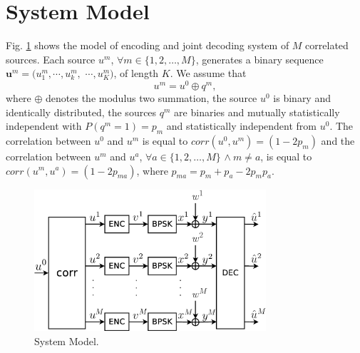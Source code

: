 \documentclass[journal]{IEEEtran}
\begin{document}
\section{System Model} \label{sec:SystemModel}

Fig. \ref{fig:modelo} shows the model of encoding and joint 
decoding system of $M$ correlated sources.
Each source $u^{m}$, $\forall m \in \{1, 2, \ldots, M\}$, generates a binary 
sequence $\mathbf{u}^{m}=(u_1^{m}, \cdots, u_k^{m},$ $\cdots, u_{K}^{m}) $, of length $K$.
 We assume that
 \begin{equation}\label{eq:fontes}
u^{m}=u^{0} \oplus q^{m},
\end{equation}
where $\oplus$ denotes the modulus two summation, the source $u^{0}$ is binary and
identically distributed, the sources $q^{m}$ are binaries and  mutually statistically 
independent with $P(q^{m}=1)=p_{m}$ and statistically independent from $u^{0}$. The 
correlation between $u^{0}$ and $u^{m}$ is equal to $corr(u^{0},u^{m})=(1-2p_{m})$ 
and the correlation between $u^{m}$ and $u^{a}$, $\forall a \in \{1, 2, \ldots, M\}$ 
$\wedge~ m \neq a$, is equal to $corr(u^{m},u^{a})=(1-2p_{ma})$, where 
$p_{ma}=p_{m}+p_a-2 p_{m} p_a. $

\begin{figure}[h!bt]
\centering
\includegraphics[width=8.6cm]{fig1.eps}
\caption{System Model.} \label{fig:modelo}
\end{figure}
\end{document}

